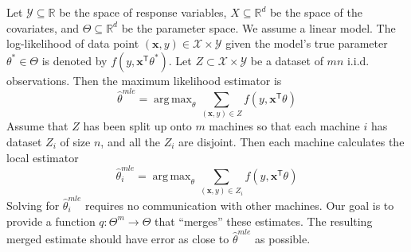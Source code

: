 \documentclass[twoside]{article}
\DeclareMathOperator*{\argmin}{arg\,min}
\DeclareMathOperator*{\argmax}{arg\,max}
\newcommand{\Q}{\mathcal{Q}}
\newcommand{\Y}{\mathcal{Y}}
\newcommand{\X}{\mathcal{X}}
\newcommand{\x}{\mathbf{x}}
\newcommand{\w}{\theta}
\newcommand{\wmle}{\hat\w^{mle}}
\newcommand{\wstar}{{\w^{*}}}
\newcommand{\wq}{\hat\w^{q}}
\newcommand{\wqstar}{\hat\w^{q^*}}
\newcommand{\trans}[1]{\ensuremath{{#1}^{\mathsf{T}}}}
\newcommand{\ltwo}[1]{{\left\lVert {#1} \right\rVert}_2}
\begin{document}

Let $\Y\subseteq\mathbb{R}$ be the space of response variables,
$X\subseteq\mathbb{R}^d$ be the space of the covariates,
and $\Theta\subseteq\mathbb{R}^d$ be the parameter space.
We assume a linear model.
The log-likelihood of data point $(\x,y)\in\X\times\Y$ given the model's true parameter $\wstar\in\Theta$ is denoted by $f(y,\trans\x\wstar)$.
Let $Z\subset\X\times\Y$ be a dataset of $mn$ i.i.d. observations.
Then the maximum likelihood estimator is
\begin{equation}
\wmle=\argmax_\w \sum_{(\x,y)\in Z} f(y,\trans\x\w)
\end{equation}
Assume that $Z$ has been split up onto $m$ machines so that each machine $i$ has dataset $Z_i$ of size $n$, and all the $Z_i$ are disjoint.
Then each machine calculates the local estimator
\begin{equation}
\wmle_i = \argmax_\w \sum_{(\x,y) \in Z_i} f(y,\trans\x\w)
\end{equation}
Solving for $\wmle_i$ requires no communication with other machines.
Our goal is to provide a function $q : \Theta^m \to \Theta$ that ``merges'' these estimates.
The resulting merged estimate should have error as close to $\wmle$ as possible.

\end{document}
